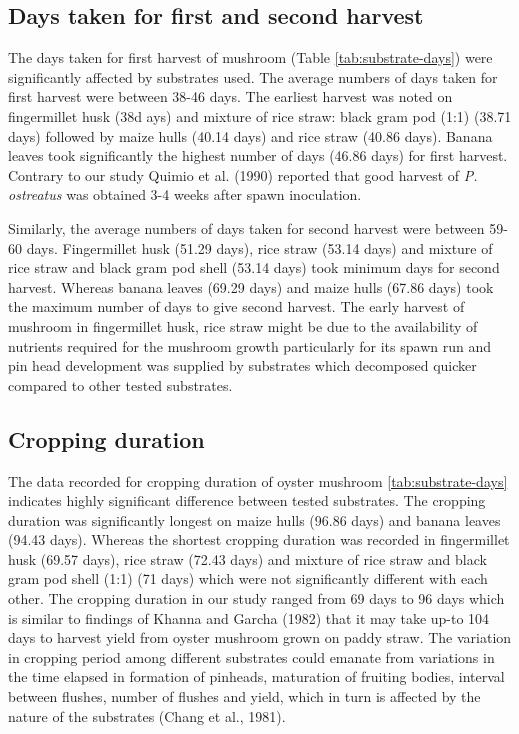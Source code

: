 \documentclass[]{elsarticle} %
\begin{document}
\hypertarget{days-taken-for-first-and-second-harvest}{%
\subsection{Days taken for first and second
harvest}\label{days-taken-for-first-and-second-harvest}}

The days taken for first harvest of mushroom (Table
\ref{tab:substrate-days}) were significantly affected by substrates
used. The average numbers of days taken for first harvest were between
38-46 days. The earliest harvest was noted on fingermillet husk (38d
ays) and mixture of rice straw: black gram pod (1:1) (38.71 days)
followed by maize hulls (40.14 days) and rice straw (40.86 days). Banana
leaves took significantly the highest number of days (46.86 days) for
first harvest. Contrary to our study Quimio et al. (1990) reported that
good harvest of \textit{P. ostreatus} was obtained 3-4 weeks after spawn
inoculation.

Similarly, the average numbers of days taken for second harvest were
between 59-60 days. Fingermillet husk (51.29 days), rice straw (53.14
days) and mixture of rice straw and black gram pod shell (53.14 days)
took minimum days for second harvest. Whereas banana leaves (69.29 days)
and maize hulls (67.86 days) took the maximum number of days to give
second harvest. The early harvest of mushroom in fingermillet husk, rice
straw might be due to the availability of nutrients required for the
mushroom growth particularly for its spawn run and pin head development
was supplied by substrates which decomposed quicker compared to other
tested substrates.

\hypertarget{cropping-duration}{%
\subsection{Cropping duration}\label{cropping-duration}}

The data recorded for cropping duration of oyster mushroom
\ref{tab:substrate-days} indicates highly significant difference between
tested substrates. The cropping duration was significantly longest on
maize hulls (96.86 days) and banana leaves (94.43 days). Whereas the
shortest cropping duration was recorded in fingermillet husk (69.57
days), rice straw (72.43 days) and mixture of rice straw and black gram
pod shell (1:1) (71 days) which were not significantly different with
each other. The cropping duration in our study ranged from 69 days to 96
days which is similar to findings of Khanna and Garcha (1982) that it
may take up-to 104 days to harvest yield from oyster mushroom grown on
paddy straw. The variation in cropping period among different substrates
could emanate from variations in the time elapsed in formation of
pinheads, maturation of fruiting bodies, interval between flushes,
number of flushes and yield, which in turn is affected by the nature of
the substrates (Chang et al., 1981).
\end{document}
